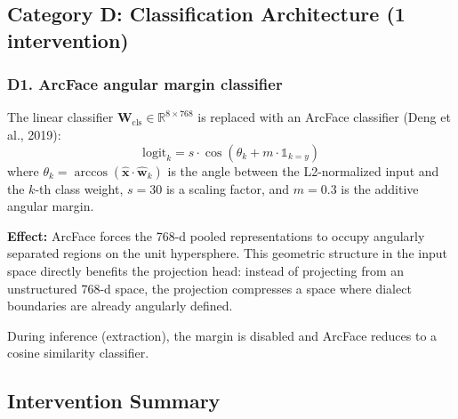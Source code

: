 \documentclass[11pt,a4paper]{article}
\newcommand{\R}{\mathbb{R}}
\begin{document}
\subsection{Category D: Classification Architecture (1 intervention)}

\subsubsection{D1. ArcFace angular margin classifier}

The linear classifier $\mathbf{W}_{\text{cls}} \in \R^{8 \times 768}$ is
replaced with an ArcFace classifier (Deng et al., 2019):
\[
\text{logit}_k = s \cdot \cos(\theta_k + m \cdot \mathbb{1}_{k = y})
\]
where $\theta_k = \arccos(\hat{\mathbf{x}} \cdot \hat{\mathbf{w}}_k)$ is
the angle between the L2-normalized input and the $k$-th class weight,
$s = 30$ is a scaling factor, and $m = 0.3$ is the additive angular margin.

\textbf{Effect:} ArcFace forces the 768-d pooled representations to occupy
angularly separated regions on the unit hypersphere. This geometric structure
in the input space directly benefits the projection head: instead of
projecting from an unstructured 768-d space, the projection compresses a
space where dialect boundaries are already angularly defined.

During inference (extraction), the margin is disabled and ArcFace reduces
to a cosine similarity classifier.

\subsection{Intervention Summary}
\end{document}
